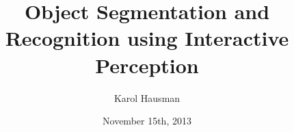 \newcommand{\thedoctype}{Master's Thesis in Informatik\xspace}
\newcommand{\thetitle}{Object Segmentation and Recognition using Interactive Perception\xspace}
\newcommand{\thetitleGer}{Objektsegmentierung und -erkennung mittels interaktiver Wahrnehmung\xspace}
\newcommand{\theauthor}{Karol Hausman\xspace}
\newcommand{\theplace}{Los Angeles\xspace}
\newcommand{\thedate}{November 15th, 2013\xspace}
\newcommand{\thesupervisor}{Dejan Pangercic}
\newcommand{\thesecsupervisor}{, Dr. J{\"u}rgen Sturm}
\newcommand{\theadvisor}{Prof. Dr. Daniel Cremers}

\date{\thedate}
\title{\thetitle}
\author{\theauthor}

\newcommand{\footertext}{}
